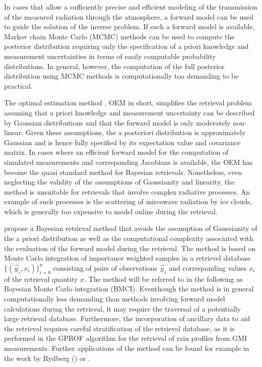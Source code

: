 \documentclass[journal abbreviation, manuscript]{copernicus}
\begin{document}
In cases that allow a sufficiently precise and efficient modeling of the transmission
of the measured radiation through the atmosphere, a forward model can be used to guide the
solution of the inverse problem. If such a forward model is available, Markov chain
Monte Carlo (MCMC) methods can be used to compute the posterior distribution
requiring only the specification of a priori knowledge and measurement uncertainties
in terms of easily computable probability distributions. In general, however, the
computation of the full posterior distribution using MCMC methods is computationally
too demanding to be practical.

The optimal estimation method \citep{rodgers}, OEM in short,
simplifies the retrieval problem assuming that a priori knowledge and
measurement uncertainty can be described by Gaussian distributions and that the
forward model is only moderately non-linear. Given these assumptions, the a
posteriori distribution is approximately Gaussian and is hence fully specified
by its expectation value and covariance matrix. In cases where an efficient
forward model for the computation of simulated measurements and corresponding
Jacobians is available, the OEM has become the quasi standard method for Bayesian
retrievals. Nonetheless, even neglecting the validity of the assumptions of
Gaussianity and linearity, the method is unsuitable for retrievals that involve
complex radiative processes. An example of such processes is the scattering
of mircowave radiation by ice clouds, which is generally too expensive to model
online during the retrieval.

\cite{kummerow_1} propose a Bayesian retrieval method that avoids the assumption
of Gaussianity of the a priori distribution as well as the computational
complexity associated with the evaluation of the forward model during the
retrieval. The method is based on Monte Carlo integration of importance weighted
samples in a retrievel database $\{(\vec{y}_i, x_i)\}_{i = 0}^n$ consisting of
pairs of observations $\vec{y}_i$ and corresponding values $x_i$ of the
retrieval quantity $x$. The method will be referred to in the following as
Bayesian Monte Carlo integration (BMCI). Eventhough the method is in general
computationally less demanding than methods involving forward model calculations
during the retrieval, it may require the traversal of a potentially large
retrieval database. Furthermore, the incorporation of ancillary data to aid the
retrieval requires careful stratification of the retrieval database, as it is
performed in the GPROF \citep{gprof} algorithm for the retrieval of rain
profiles from GMI measurements. Further applications of the method can be
found for example in the work by Rydberg (\citeyear{rydberg_2, rydberg_1})
or \cite{evans_2}.
\end{document}
